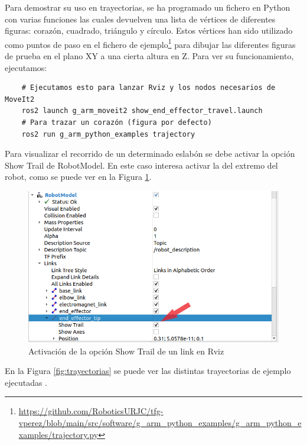 Para demostrar su uso en trayectorias, se ha programado un fichero en Python con varias funciones las cuales devuelven una lista de vértices de diferentes 
figuras: corazón, cuadrado, triángulo y círculo. Estos vértices han sido utilizado como puntos de paso en el fichero de 
ejemplo\footnote{\url{https://github.com/RoboticsURJC/tfg-vperez/blob/main/src/software/g\_arm\_python_examples/g\_arm_python\_examples/trajectory.py}} para 
dibujar las diferentes figuras de prueba en el plano XY a una cierta altura en Z. Para ver su funcionamiento, ejecutamos:
\begin{verbatim}
    # Ejecutamos esto para lanzar Rviz y los nodos necesarios de MoveIt2
    ros2 launch g_arm_moveit2 show_end_effector_travel.launch 
    # Para trazar un corazón (figura por defecto)
    ros2 run g_arm_python_examples trajectory
\end{verbatim}

Para visualizar el recorrido de un determinado eslabón se debe activar la opción Show Trail de RobotModel. En este caso interesa activar la 
del extremo del robot, como se puede ver en la Figura \ref{fig:activarTrail}.
\begin{figure} [ht!]
    \begin{center}
        \includegraphics[width=12cm]{figs/rviz_show_trail.png}
    \end{center}
    \caption{Activación de la opción Show Trail de un link en Rviz}
\label{fig:activarTrail}
\end{figure}

En la Figura \ref{fig:trayectorias} se puede ver las distintas trayectorias de ejemplo ejecutadas .

